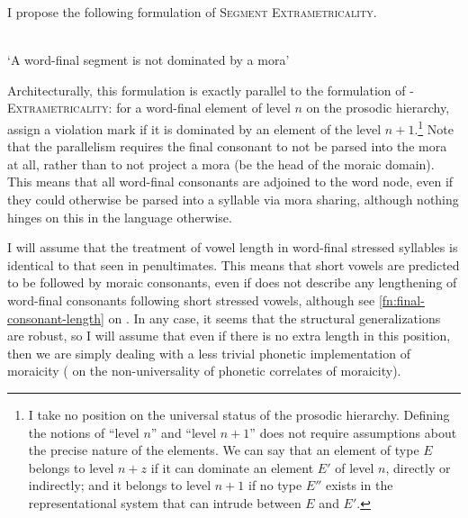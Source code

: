I propose the following formulation of \textsc{Segment Extrametricality}.

\begin{constraint}
  \\
  `A word\hyp final segment is not dominated by a mora'
\end{constraint}

Architecturally, this formulation is exactly parallel to the formulation of \sy-\hspace{0pt}\textsc{Extrametricality}: for a word-final element of level $n$ on the prosodic hierarchy,  assign a violation mark if it is dominated by an element of the level $n+1$.\footnote{I take no position on the universal status of the prosodic hierarchy. Defining the notions of \enquote{level $n$} and \enquote{level $n+1$} does not require assumptions about the precise nature of the elements. We can say that an element of type $E$ belongs to level $n+z$ if it can dominate an element $E'$ of level $n$, directly or indirectly; and it belongs to level $n+1$ if no type $E''$ exists in the representational system that can intrude between $E$ and $E'$.} Note that the parallelism requires the final consonant to not be parsed into the mora at all, rather than to not project a mora (be the head of the moraic domain). This means that all word-final consonants are adjoined to the word node, even if they could otherwise be parsed into a syllable via mora sharing, although nothing hinges on this in the language otherwise.

I will assume that the treatment of vowel length in word-final stressed syllables is identical to that seen in penultimates. This means that short vowels are predicted to be followed by moraic consonants, even if \citet{awbery86:_pembr_welsh} does not describe any lengthening of word-final consonants following short stressed vowels, although see \cref{fn:final-consonant-length} on . In any case, it seems that the structural generalizations are robust, so I will assume that even if there is no extra length in this position, then we are simply dealing with a less trivial phonetic implementation of moraicity (\cf \citealt[\emph{et passim}]{gordon06:_syllab} on the non-universality of phonetic correlates of moraicity).

